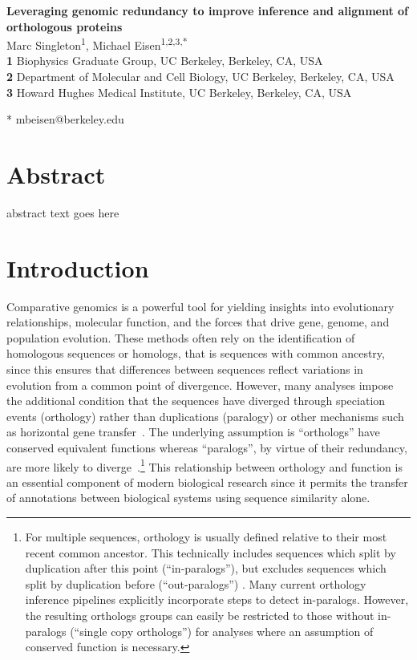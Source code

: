 \documentclass[10pt,letterpaper]{article}
\begin{document}
\begin{flushleft}
{\Large\textbf{Leveraging genomic redundancy to improve inference and alignment of orthologous proteins}}
\newline
\\
Marc Singleton\textsuperscript{1},
Michael Eisen\textsuperscript{1,2,3,*}
\\
\bigskip
\textbf{1} Biophysics Graduate Group, UC Berkeley, Berkeley, CA, USA
\\
\textbf{2} Department of Molecular and Cell Biology, UC Berkeley, Berkeley, CA, USA
\\
\textbf{3} Howard Hughes Medical Institute, UC Berkeley, Berkeley, CA, USA
\\
\bigskip

* mbeisen@berkeley.edu

\end{flushleft}

\section*{Abstract}
abstract text goes here

\section*{Introduction}
Comparative genomics is a powerful tool for yielding insights into evolutionary relationships, molecular function, and the forces that drive gene, genome, and population evolution. These methods often rely on the identification of homologous sequences or homologs, that is sequences with common ancestry, since this ensures that differences between sequences reflect variations in evolution from a common point of divergence. However, many analyses impose the additional condition that the sequences have diverged through speciation events (orthology) rather than duplications (paralogy) or other mechanisms such as horizontal gene transfer~\cite{Fitch1970}. The underlying assumption is ``orthologs'' have conserved equivalent functions whereas ``paralogs'', by virtue of their redundancy, are more likely to diverge~\cite{Ohno1970, Nowak1997, Altenhoff2012, Pegueroles2013, Soria2014}.\footnote{For multiple sequences, orthology is usually defined relative to their most recent common ancestor. This technically includes sequences which split by duplication after this point (``in-paralogs''), but excludes sequences which split by duplication before (``out-paralogs'') \cite{Remm2001}. Many current orthology inference pipelines explicitly incorporate steps to detect in-paralogs. However, the resulting orthologs groups can easily be restricted to those without in-paralogs (``single copy orthologs'') for analyses where an assumption of conserved function is necessary.} This relationship between orthology and function is an essential component of modern biological research since it permits the transfer of annotations between biological systems using sequence similarity alone.
\end{document}

